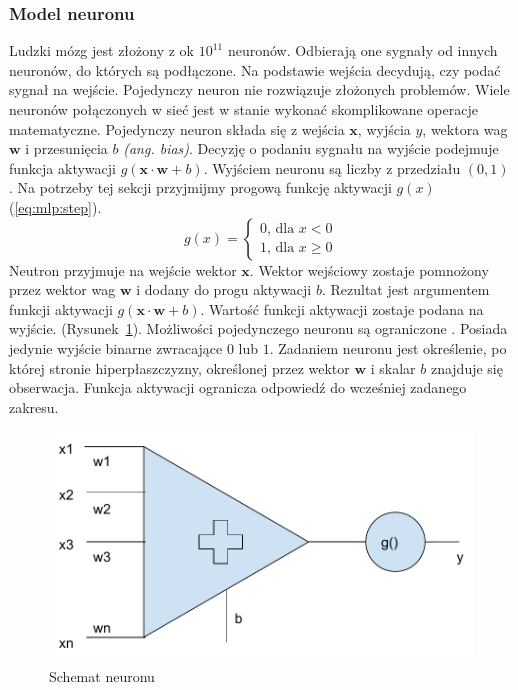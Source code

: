 \documentclass[a4paper,12pt,twoside,openany]{report}
\newcommand{\ang}[1]{\textit{(ang. #1)}}
\newcommand{\Rys}[1]{(Rysunek~\ref{#1})}
\newcommand{\Eq}[1]{(\ref{#1})}
\renewcommand{\vec}[1]{\bm{#1}}
\begin{document}
\subsubsection{Model neuronu}
Ludzki mózg jest złożony z ok $10^{11}$ neuronów.
Odbierają one sygnały od innych neuronów, do których są podłączone.
Na podstawie wejścia decydują, czy podać sygnał na wejście.
Pojedynczy neuron nie rozwiązuje złożonych problemów.
Wiele neuronów połączonych w sieć jest w stanie wykonać skomplikowane operacje matematyczne.
Pojedynczy neuron składa się z wejścia $\vec{x}$, wyjścia $y$, wektora wag $\vec{w}$ i przesunięcia $b$ \ang{bias}.
Decyzję o podaniu sygnału na wyjście podejmuje funkcja aktywacji $g(\vec{x} \cdot \vec{w} + b)$.
Wyjściem neuronu są liczby z przedziału $(0, 1)$.
Na potrzeby tej sekcji przyjmijmy progową funkcję aktywacji $g(x)$ \Eq{eq:mlp:step}.
\begin{equation}
	\label{eq:mlp:step}
g(x)={\begin{cases}0{\text{, dla }}x<0\\1{\text{, dla }}x\geq 0\end{cases}}
\end{equation}
Neutron przyjmuje na wejście wektor $\vec{x}$.
Wektor wejściowy zostaje pomnożony przez wektor wag $\vec{w}$ i dodany do progu aktywacji $b$.
Rezultat jest argumentem funkcji aktywacji  $g(\vec{x} \cdot \vec{w} + b)$.
Wartość funkcji aktywacji zostaje podana na wyjście. \Rys{rys:mlp:neuron}.
Możliwości pojedynczego neuronu są ograniczone \cite{Jeon2018}.
Posiada jedynie wyjście binarne zwracające $0$ lub $1$. 
Zadaniem neuronu jest określenie, po której stronie hiperpłaszczyzny, 
określonej przez wektor $\vec w$ i skalar $b$ znajduje się obserwacja.
Funkcja aktywacji ogranicza odpowiedź do wcześniej zadanego zakresu.
\begin{figure}[h]
	\centering
	\includegraphics[width=\textwidth]{neuron}
	\caption{Schemat neuronu}
	\label{rys:mlp:neuron}
\end{figure}
\end{document}
